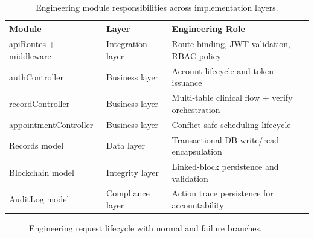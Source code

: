 \documentclass[12pt,a4paper]{report}
\begin{document}
\begin{table}[htbp]
\centering
\caption{Engineering module responsibilities across implementation layers.}
\label{tab:engineering-module-map}
\begin{tabular}{p{} p{} p{}}
\toprule
\textbf{Module} & \textbf{Layer} & \textbf{Engineering Role} \\
\midrule
apiRoutes + middleware & Integration layer & Route binding, JWT validation, RBAC policy \\
authController & Business layer & Account lifecycle and token issuance \\
recordController & Business layer & Multi-table clinical flow + verify orchestration \\
appointmentController & Business layer & Conflict-safe scheduling lifecycle \\
Records model & Data layer & Transactional DB write/read encapsulation \\
Blockchain model & Integrity layer & Linked-block persistence and validation \\
AuditLog model & Compliance layer & Action trace persistence for accountability \\
\bottomrule
\end{tabular}
\end{table}

\begin{figure}[htbp]
\centering
{}
\caption{Engineering request lifecycle with normal and failure branches.}
\label{fig:engineering-request-lifecycle}
\end{figure}
\end{document}

